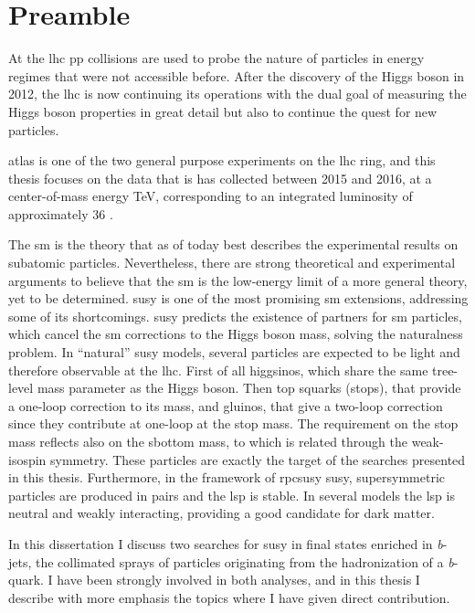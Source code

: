 \chapter{Preamble}

At the \gls{lhc} \gls{pp} collisions are used to probe the nature of particles in energy regimes that were not accessible before. 
After the discovery of the Higgs boson in 2012, the \gls{lhc} is now continuing its operations with the dual goal 
of measuring the Higgs boson properties in great detail but also to continue the quest for new particles.

\gls{atlas} is one of the two general purpose experiments on the \gls{lhc} ring, and this thesis focuses on the data that is has collected between 
2015 and 2016, 
at a center-of-mass energy \cmtre TeV, corresponding to an 
integrated luminosity of approximately 36 \ifb. 

The \gls{sm} is the theory that as of today best describes the experimental results on subatomic particles. 
Nevertheless, there are strong theoretical and experimental arguments to believe that the \gls{sm} is the low-energy limit 
of a more general theory, yet to be determined. 
\gls{susy} is one of the most promising \gls{sm} extensions, 
addressing some of its shortcomings. \gls{susy} predicts the existence of partners for  
\gls{sm} particles, which cancel the \gls{sm} corrections to the Higgs boson mass, solving the naturalness problem. 
In ``natural'' \gls{susy} models, several particles are expected to be light and therefore observable at the \gls{lhc}.
First of all higgsinos, which share the same tree-level mass parameter as the Higgs boson. 
Then top squarks (stops), that provide a one-loop correction to its mass, and gluinos, that give a two-loop correction since they contribute 
at one-loop at the stop mass. 
The requirement on the stop mass reflects also on the sbottom mass, to which is related through the weak-isospin symmetry. 
These particles are exactly the target of the searches presented in this thesis.
Furthermore, in the framework of \gls{rpcsusy} \gls{susy}, supersymmetric particles are produced in pairs and the 
\gls{lsp} is stable. 
In several models the \gls{lsp} is neutral and weakly interacting, providing a good candidate for dark matter.
 

In this dissertation I discuss two searches for \gls{susy} in final states enriched in \textit{b}-jets, the collimated sprays of 
particles originating from the hadronization of a \textit{b}-quark. 
I have been strongly involved in both analyses, 
and in this thesis I describe with more emphasis the topics where I have given direct contribution.

